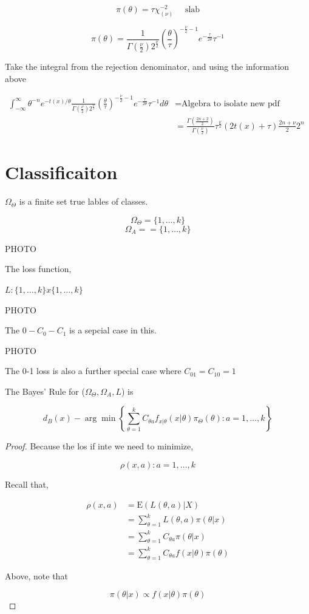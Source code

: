 \documentclass[11pt,fleqn]{book} %
\newcommand{\E}{\mathrm{E}}
\begin{document}
			$$\pi(\theta) = \tau \chi^{-2}_{(\nu)} \quad \text{ slab}$$

			$$\pi(\theta) = \frac{1}{\Gamma(\frac{\nu}{2}) 2^{\frac{\nu}{2}}} (\frac{\theta}{\tau})^{-\frac{\nu}{2} - 1} e^{- \frac{\tau}{2 \theta}} \tau^{-1} $$

	Take the integral from the rejection denominator, and using the information above

			\begin{align*}
				\int^\infty_{-\infty} \theta^{-n} e^{-t(x)/\theta}  \frac{1}{\Gamma(\frac{\nu}{2}) 2^{\frac{\nu}{2}}} (\frac{\theta}{\tau})^{-\frac{\nu}{2} - 1} e^{- \frac{\tau}{2 \theta}} \tau^{-1} d\theta &= \text{Algebra to isolate new pdf (integrates to 1)}\\
					&=\frac{\Gamma(\frac{2n + 2}{2})}{\Gamma(\frac{\nu}{2})} \tau^{\frac{\nu}{2}}(2 t(x) + \tau) \frac{2n + \nu}{2} 2^n
			\end{align*}

\section{Classificaiton}

$\Omega_\Theta$ is a finite set true lables of classes. 

		$$\Omega_\Theta = \{1, \dots, k\} $$
		$$\Omega_A = =\{1, \dots, k\} $$

PHOTO
	
The loss function, 

	$L:\{1, \dots, k\} x \{1, \dots, k\}$

PHOTO

The $0 - C_0 - C_1$ is a sepcial case in this. 

PHOTO

The 0-1 loss is also a further special case where $C_{01} = C_{10} = 1 $


\begin{theorem}
	The Bayes' Rule for ($\Omega_\Theta, \Omega_A, L$) is 

			$$d_B(x) - \arg\min\left\{\sum^k_{\theta=1}C_{\theta a} f_{x|\theta}(x|\theta) \pi_\Theta(\theta): a = 1, \dots, k \right\} $$
\end{theorem}

\begin{proof}
	Because the los if inte we need to minimize, 

			$$\rho(x, a): a = 1, \dots, k $$

	Recall that, 

			\begin{align*}
				\rho(x, a) &= \E(L(\theta, a)|X)\\
					&= \sum^k_{\theta=1} L(\theta, a) \pi(\theta|x)\\
					&= \sum^k_{\theta = 1} C_{\theta a} \pi(\theta|x)\\
					&= \sum^k_{\theta = 1} C_{\theta a} f(x|\theta)\pi(\theta)
			\end{align*}

	Above, note that 

			$$\pi(\theta|x) \propto f(x|\theta) \pi(\theta) $$ 
\end{proof}
\end{document}
